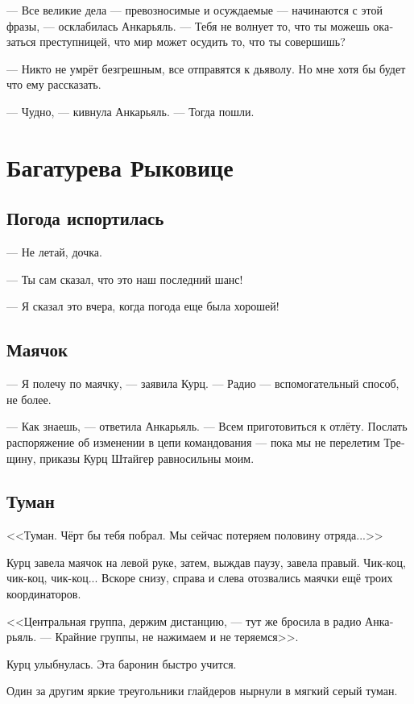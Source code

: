 \documentclass[a4paper,12pt,fleqn]{book}\usepackage{polyglossia}\setdefaultlanguage[babelshorthands=true]{russian}\setotherlanguage{english}\defaultfontfeatures{Ligatures=TeX,Mapping=tex-text}\usepackage{xcolor}\newcommand{\ml}[3]{#2}
\begin{document}
--- Все великие дела --- превозносимые и осуждаемые --- начинаются с этой фразы, --- осклабилась Анкарьяль.
--- Тебя не волнует то, что ты можешь оказаться преступницей, что мир может осудить то, что ты совершишь?

--- Никто не умрёт безгрешным, все отправятся к дьяволу.
Но мне хотя бы будет что ему рассказать.

--- Чудно, --- кивнула Анкарьяль.
--- Тогда пошли.

\chapter{Багатурева Рыковице}

\section{Погода испортилась}

--- Не летай, дочка.

--- Ты сам сказал, что это наш последний шанс!

--- Я сказал это вчера, когда погода еще была хорошей!

\section{Маячок}

--- Я полечу по маячку, --- заявила Курц.
--- Радио --- вспомогательный способ, не более.

--- Как знаешь, --- ответила Анкарьяль.
--- Всем приготовиться к отлёту.
Послать распоряжение об изменении в цепи командования --- пока мы не перелетим Трещину, приказы Курц Штайгер равносильны моим.

\section{Туман}

<<Туман.
Чёрт бы тебя побрал.
Мы сейчас потеряем половину отряда...>>

Курц завела маячок на левой руке, затем, выждав паузу, завела правый.
Чик-коц, чик-коц, чик-коц...
Вскоре снизу, справа и слева отозвались маячки ещё троих координаторов.

<<Центральная группа, держим дистанцию, --- тут же бросила в радио Анкарьяль.
--- Крайние группы, не нажимаем и не теряемся>>.

Курц улыбнулась.
Эта баронин быстро учится.

Один за другим яркие треугольники глайдеров нырнули в мягкий серый туман.
\end{document}
